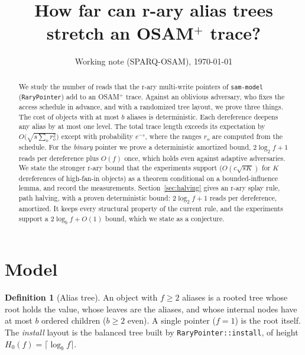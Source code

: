 \documentclass[11pt]{article}
\title{How far can r-ary alias trees stretch an OSAM$^+$ trace?}
\author{Working note (SPARQ-OSAM), \today}
\date{}
\theoremstyle{definition}
\newtheorem{definition}[theorem]{Definition}
\begin{document}
\maketitle

\begin{abstract}
We study the number of reads that the r-ary multi-write pointers of
\texttt{sam-model} (\texttt{RaryPointer}) add to an OSAM$^+$ trace. Against an
oblivious adversary, who fixes the access schedule in advance, and with a
randomized tree layout, we prove three things. The cost of objects with at most
$b$ aliases is deterministic. Each dereference deepens any alias by at most one
level. The total trace length exceeds its expectation by
$O\bigl(\sqrt{s\sum_o r_o^2}\bigr)$ except with probability $e^{-s}$, where the
ranges $r_o$ are computed from the schedule. For the \emph{binary} pointer we prove a
deterministic amortized bound, $2\log_2 f+1$ reads per dereference plus
$O(f)$ once, which holds even against adaptive adversaries. We state the stronger r-ary bound that the
experiments support ($O(c\sqrt{sK})$ for $K$ dereferences of high-fan-in
objects) as a theorem conditional on a bounded-influence lemma, and record the
measurements.
Section~\ref{sec:halving} gives an r-ary splay rule, path halving, with a
proven deterministic bound: $2\log_2 f+1$ reads per dereference, amortized.
It keeps every structural property of the current rule, and the experiments
support a $2\log_b f+O(1)$ bound, which we state as a conjecture.
\end{abstract}

\section{Model}

\begin{definition}[Alias tree]
An object with $f\ge 2$ aliases is a rooted tree whose root holds the value,
whose leaves are the aliases, and whose internal nodes have at most $b$ ordered
children ($b\ge 2$ even). A single pointer ($f=1$) is the root itself. The
\emph{install} layout is the balanced tree built by
\texttt{RaryPointer::install}, of height $H_0(f)=\lceil\log_b f\rceil$.
\end{definition}
\end{document}
